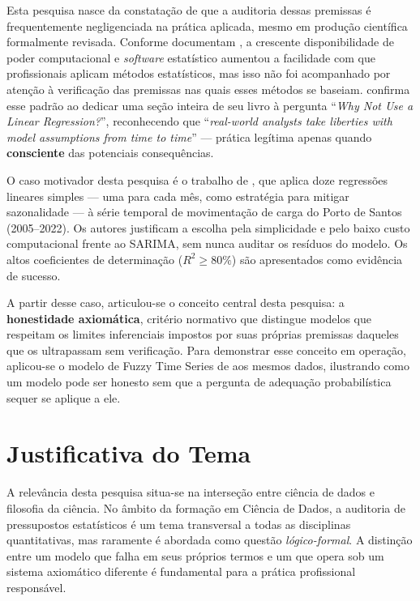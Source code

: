 \documentclass[
    12pt,
    oneside,
    openany,
    a4paper,
    english,
    brazil
]{abntex2}
\theoremstyle{definition}
\begin{document}
Esta pesquisa nasce da constatação de que a auditoria dessas premissas é frequentemente negligenciada na prática aplicada, mesmo em produção científica formalmente revisada. Conforme documentam , a crescente disponibilidade de poder computacional e \textit{software} estatístico aumentou a facilidade com que profissionais aplicam métodos estatísticos, mas isso não foi acompanhado por atenção à verificação das premissas nas quais esses métodos se baseiam.  confirma esse padrão ao dedicar uma seção inteira de seu livro à pergunta ``\textit{Why Not Use a Linear Regression?}'', reconhecendo que ``\textit{real-world analysts take liberties with model assumptions from time to time}'' --- prática legítima apenas quando \textbf{consciente} das potenciais consequências.

O caso motivador desta pesquisa é o trabalho de , que aplica doze regressões lineares simples --- uma para cada mês, como estratégia para mitigar sazonalidade --- à série temporal de movimentação de carga do Porto de Santos (2005--2022). Os autores justificam a escolha pela simplicidade e pelo baixo custo computacional frente ao SARIMA, sem nunca auditar os resíduos do modelo. Os altos coeficientes de determinação ($R^2 \geq 80\%$) são apresentados como evidência de sucesso.

A partir desse caso, articulou-se o conceito central desta pesquisa: a \textbf{honestidade axiomática}, critério normativo que distingue modelos que respeitam os limites inferenciais impostos por suas próprias premissas daqueles que os ultrapassam sem verificação. Para demonstrar esse conceito em operação, aplicou-se o modelo de Fuzzy Time Series de  aos mesmos dados, ilustrando como um modelo pode ser honesto sem que a pergunta de adequação probabilística sequer se aplique a ele.

\section{Justificativa do Tema}
\label{sec:justificativa}

A relevância desta pesquisa situa-se na interseção entre ciência de dados e filosofia da ciência. No âmbito da formação em Ciência de Dados, a auditoria de pressupostos estatísticos é um tema transversal a todas as disciplinas quantitativas, mas raramente é abordada como questão \textit{lógico-formal}. A distinção entre um modelo que falha em seus próprios termos e um que opera sob um sistema axiomático diferente é fundamental para a prática profissional responsável.
\end{document}
